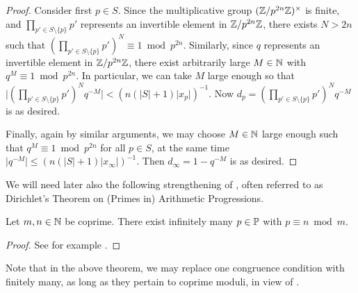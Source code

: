 \documentclass[12pt, leqno, british]{amsart}
\begin{document}
\begin{proof}
Consider first $p \in S$.
Since the multiplicative group $(\mathbb Z/p^{2n}\mathbb Z)^\times$ is finite, and $\prod_{p' \in S \setminus \lbrace p \rbrace} p'$ represents an invertible element in $\mathbb Z/p^{2n}\mathbb Z$, there exists $N > 2n$ such that $(\prod_{p' \in S \setminus \lbrace p \rbrace} p')^N \equiv 1 \bmod p^{2n}$.
Similarly, since $q$ represents an invertible element in $\mathbb Z/p^{2n}\mathbb Z$, there exist arbitrarily large $M \in \mathbb N$ with $q^M \equiv 1 \bmod p^{2n}$.
In particular, we can take $M$ large enough so that $\lvert (\prod_{p' \in S \setminus \lbrace p \rbrace} p')^N q^{-M} \rvert < (n(\lvert S \rvert + 1)\lvert x_p \rvert)^{-1}$.
Now $d_p = (\prod_{p' \in S \setminus \lbrace p \rbrace} p')^N q^{-M}$ is as desired.

Finally, again by similar arguments, we may choose $M \in \mathbb N$ large enough such that $q^{M} \equiv 1 \bmod p^{2n}$ for all $p \in S$, at the same time $\lvert q^{-M} \rvert \leq (n(\lvert S \rvert + 1) \lvert x_\infty \rvert)^{-1}$.
Then $d_\infty = 1 - q^{-M}$ is as desired.
\end{proof}
We will need later also the following strengthening of , often referred to as Dirichlet's Theorem on (Primes in) Arithmetic Progressions.
\begin{thm}\label{T:Dirichlet}
Let $m, n \in \mathbb N$ be coprime.
There exist infinitely many $p \in \mathbb P$ with $p \equiv n \bmod m$.
\end{thm}
\begin{proof}
See for example \cite[Section I.10, Exercise 1]{Neu99}.
\end{proof}
Note that in the above theorem, we may replace one congruence condition with finitely many, as long as they pertain to coprime moduli, in view of .
\end{document}
